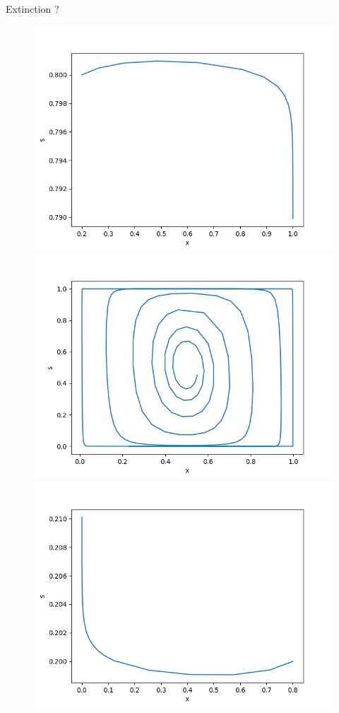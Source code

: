 \documentclass[10pt]{beamer}
\begin{document}
\begin{frame}{Extinction ?}
\begin{figure}
\centering
\includegraphics[scale=0.2]{traj1D202081e-3.png}
\includegraphics[scale=0.2]{traj1D20550451.png}
\includegraphics[scale=0.2]{traj1D208021e-3.png}

\end{figure}
\end{frame}
\end{document}
